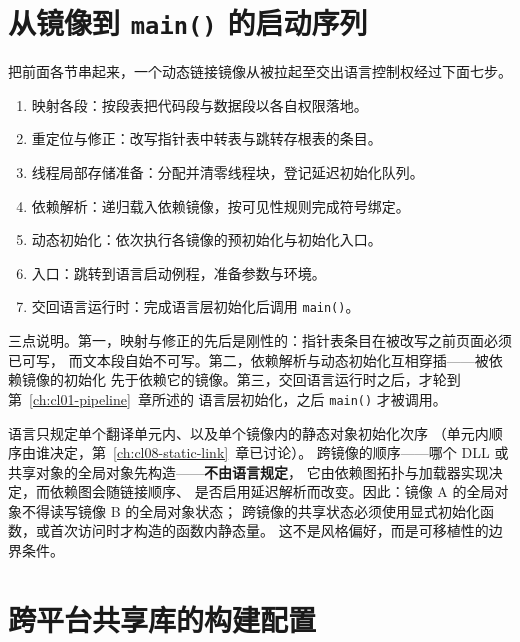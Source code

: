 \documentclass[12pt,a4paper,fontset=fandol]{ctexbook}
\newcommand{\Fn}[1]{\texttt{#1()}}
\begin{document}
\section{从镜像到 \Fn{main} 的启动序列}\label{sec:cl09-startup}

把前面各节串起来，一个动态链接镜像从被拉起至交出语言控制权经过下面七步。

\begin{flow}[title={执行镜像到 \Fn{main} 的启动序列}]
  \begin{enumerate}
    \item 映射各段：按段表把代码段与数据段以各自权限落地。
    \item 重定位与修正：改写指针表中转表与跳转存根表的条目。
    \item 线程局部存储准备：分配并清零线程块，登记延迟初始化队列。
    \item 依赖解析：递归载入依赖镜像，按可见性规则完成符号绑定。
    \item 动态初始化：依次执行各镜像的预初始化与初始化入口。
    \item 入口：跳转到语言启动例程，准备参数与环境。
    \item 交回语言运行时：完成语言层初始化后调用 \Fn{main}。
  \end{enumerate}
\end{flow}

三点说明。第一，映射与修正的先后是刚性的：指针表条目在被改写之前页面必须已可写，
而文本段自始不可写。第二，依赖解析与动态初始化互相穿插——被依赖镜像的初始化
先于依赖它的镜像。第三，交回语言运行时之后，才轮到第~\ref{ch:cl01-pipeline}~章所述的
语言层初始化，之后 \Fn{main} 才被调用。

\begin{warning}[title={静态初始化顺序只在单个镜像内有保证}]
  语言只规定单个翻译单元内、以及单个镜像内的静态对象初始化次序
  （单元内顺序由谁决定，第~\ref{ch:cl08-static-link}~章已讨论）。
  跨镜像的顺序——哪个 DLL 或共享对象的全局对象先构造——\textbf{不由语言规定}，
  它由依赖图拓扑与加载器实现决定，而依赖图会随链接顺序、
  是否启用延迟解析而改变。因此：镜像 A 的全局对象不得读写镜像 B 的全局对象状态；
  跨镜像的共享状态必须使用显式初始化函数，或首次访问时才构造的函数内静态量。
  这不是风格偏好，而是可移植性的边界条件。
\end{warning}

\section{跨平台共享库的构建配置}\label{sec:cl09-cmake}
\end{document}
